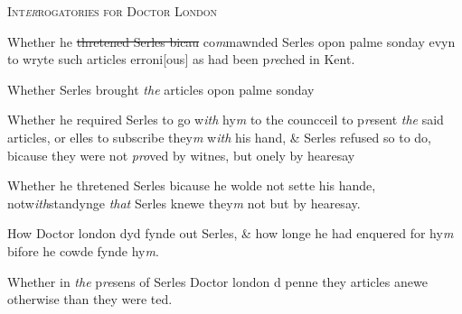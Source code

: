 \documentclass[12pt, a4paper]{book}
\begin{document}
			
				\begin{center} \begin{large} {\scshape Int\textit{er}rogatories for Doctor London
			} \end{large} \end{center}
			
            		
            			
		\ifthenelse{\isodd{\thepage}}
		{\reversemarginpar}
		{\normalmarginpar}
		Whether he \sout{thretened Serles bicau} co\textit{m}mawnded Serles opon palme sonday evyn to wryte such articles erroni[ous] as had been p\textit{re}ched in Kent.
            		
            		
            			
		\ifthenelse{\isodd{\thepage}}
		{\reversemarginpar}
		{\normalmarginpar}
		Whether Serles brought \textit{the} articles opon palme sonday
            		
            		
            			
		\ifthenelse{\isodd{\thepage}}
		{\reversemarginpar}
		{\normalmarginpar}
		Whether he required Serles to go w\textit{ith} hy\textit{m} to the
 councceil to p\textit{re}sent \textit{the} said articles, or elles to subscribe they\textit{m} w\textit{ith} his hand, \& Serles refused so to do, bicause they were not \textit{pro}ved by witnes, but onely by hearesay
            		
            		
            			
		\ifthenelse{\isodd{\thepage}}
		{\reversemarginpar}
		{\normalmarginpar}
		Whether he thretened Serles bicause he wolde not sette his hande, notw\textit{ith}standynge \textit{that} Serles knewe they\textit{m} not but by hearesay.
            		
            		
            			
				\marginpar[\vspace{0.5cm}{\textcolor{Gray}{+}}]{}
			
            			
		\ifthenelse{\isodd{\thepage}}
		{\reversemarginpar}
		{\normalmarginpar}
		How Doctor london dyd fynde out Serles, \& how longe he had enquered for hy\textit{m} bifore he cowde fynde hy\textit{m}.
			 
            		
            			
		\ifthenelse{\isodd{\thepage}}
		{\reversemarginpar}
		{\normalmarginpar}
		Whether in \textit{the} p\textit{re}sens of Serles Doctor london d
            			penne they articles
			 anewe otherwise than they were
 ted.
            		
\end{document}
